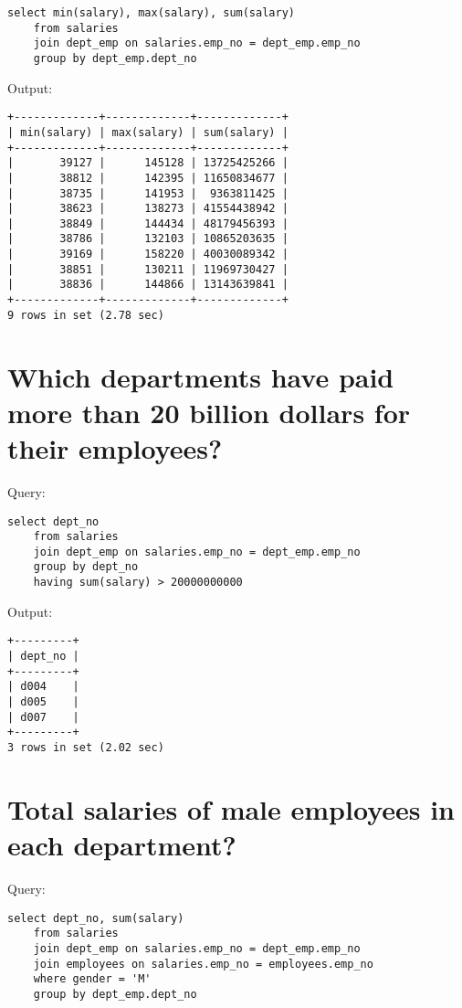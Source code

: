\documentclass[12pt]{article}
\begin{document}
\begin{verbatim}
select min(salary), max(salary), sum(salary)
    from salaries
    join dept_emp on salaries.emp_no = dept_emp.emp_no
    group by dept_emp.dept_no
\end{verbatim}

Output:

\begin{verbatim}
+-------------+-------------+-------------+
| min(salary) | max(salary) | sum(salary) |
+-------------+-------------+-------------+
|       39127 |      145128 | 13725425266 |
|       38812 |      142395 | 11650834677 |
|       38735 |      141953 |  9363811425 |
|       38623 |      138273 | 41554438942 |
|       38849 |      144434 | 48179456393 |
|       38786 |      132103 | 10865203635 |
|       39169 |      158220 | 40030089342 |
|       38851 |      130211 | 11969730427 |
|       38836 |      144866 | 13143639841 |
+-------------+-------------+-------------+
9 rows in set (2.78 sec)
\end{verbatim}


\section{Which departments have paid more than 20 billion dollars for their employees?}

Query:

\begin{verbatim}
select dept_no
    from salaries
    join dept_emp on salaries.emp_no = dept_emp.emp_no
    group by dept_no
    having sum(salary) > 20000000000
\end{verbatim}

Output:

\begin{verbatim}
+---------+
| dept_no |
+---------+
| d004    |
| d005    |
| d007    |
+---------+
3 rows in set (2.02 sec)
\end{verbatim}


\section{Total salaries of male employees in each department?}

Query:

\begin{verbatim}
select dept_no, sum(salary)
    from salaries
    join dept_emp on salaries.emp_no = dept_emp.emp_no
    join employees on salaries.emp_no = employees.emp_no
    where gender = 'M'
    group by dept_emp.dept_no
\end{verbatim}
\end{document}
